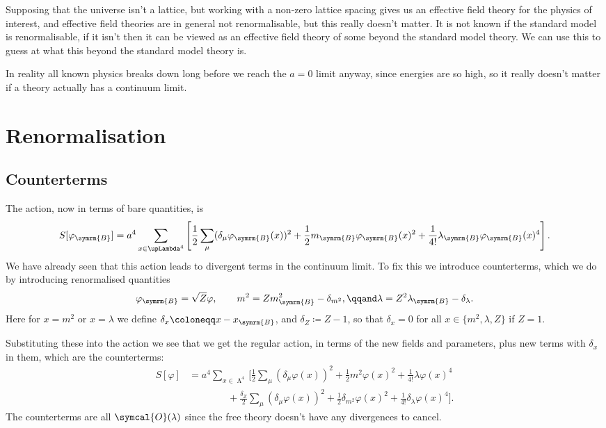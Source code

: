 \documentclass[fleqn]{NotesClass}
\newcommand{\bare}{\symrm{B}}
\newcommand{\order}{\symcal{O}}
\newcommand{\lattice}[1][4]{\upLambda^{#1}}
\newcommand{\forwardDerivative}{\delta}
\begin{document}
    Supposing that the universe isn't a lattice, but working with a non-zero lattice spacing gives us an effective field theory for the physics of interest, and effective field theories are in general not renormalisable, but this really doesn't matter.
    It is not known if the standard model is renormalisable, if it isn't then it can be viewed as an effective field theory of some beyond the standard model theory.
    We can use this to guess at what this beyond the standard model theory is.
    
    In reality all known physics breaks down long before we reach the \(a = 0\) limit anyway, since energies are so high, so it really doesn't matter if a theory actually has a continuum limit.
    
    \chapter{Renormalisation}
    \section{Counterterms}
    The action, now in terms of bare quantities, is
    \begin{equation}
        S[\varphi_{\bare}] = a^4 \sum_{x\in\lattice} \left[ \frac{1}{2} \sum_{\mu} (\forwardDerivative_\mu \varphi_{\bare}(x))^2 + \frac{1}{2}m_{\bare} \varphi_{\bare}(x)^2 + \frac{1}{4!} \lambda_{\bare} \varphi_{\bare}(x)^4 \right].
    \end{equation}
    We have already seen that this action leads to divergent terms in the continuum limit.
    To fix this we introduce counterterms, which we do by introducing renormalised quantities
    \begin{equation}
        \varphi_{\bare} = \sqrt{Z} \varphi, \qquad m^2 = Zm_{\bare}^2 - \delta_{m^2}, \qqand \lambda = Z^2\lambda_{\bare} - \delta_{\lambda}.
    \end{equation}
    Here for \(x = m^2\) or \(x = \lambda\) we define \(\delta_{x} \coloneqq x - x_{\bare}\), and \(\delta_Z \coloneqq Z - 1\), so that \(\delta_x = 0\) for all \(x \in \{m^2, \lambda, Z\}\) if \(Z = 1\).
    
    Substituting these into the action we see that we get the regular action, in terms of the new fields and parameters, plus new terms with \(\delta_x\) in them, which are the counterterms:
    \begin{align}
        S[\varphi] &= a^4 \sum_{x\in\lattice} \bigg[ \frac{1}{2} \sum_{\mu} (\forwardDerivative_\mu \varphi(x))^2 + \frac{1}{2}m^2\varphi(x)^2 + \frac{1}{4!}\lambda \varphi(x)^4\\
        &\qquad\qquad+ \frac{\delta_Z}{2}\sum_{\mu} (\forwardDerivative_\mu \varphi(x))^2 + \frac{1}{2}\delta_{m^2} \varphi(x)^2 + \frac{1}{4!}\delta_{\lambda} \varphi(x)^4 \bigg].
    \end{align}
    The counterterms are all \(\order(\lambda)\) since the free theory doesn't have any divergences to cancel.
    
\end{document}
